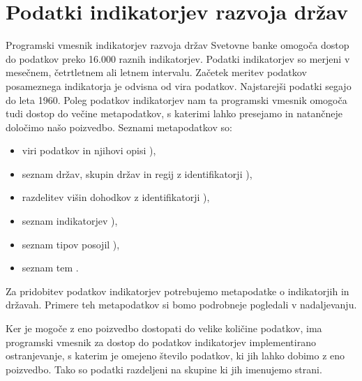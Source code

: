 \section{Podatki indikatorjev razvoja držav}
\label{sec:podatki_ind_razvoja}



Programski vmesnik indikatorjev razvoja držav Svetovne banke omogoča dostop
do podatkov preko 16.000 raznih indikatorjev. Podatki indikatorjev so merjeni v
mesečnem, četrtletnem ali letnem intervalu. Začetek meritev podatkov
posameznega indikatorja je odvisna od vira podatkov. Najstarejši podatki segajo
do leta 1960. Poleg podatkov indikatorjev nam ta programski vmesnik omogoča 
tudi dostop do večine metapodatkov, s katerimi lahko presejamo in natančneje
določimo našo poizvedbo. Seznami metapodatkov so:
\begin{itemize}
\item viri podatkov in njihovi opisi 
	),
\item seznam držav, skupin držav in regij z identifikatorji 
	),
\item razdelitev višin dohodkov z identifikatorji 
	),
\item seznam indikatorjev 
  ),
\item seznam tipov posojil 
	),
\item seznam tem .
\end{itemize}

Za pridobitev podatkov indikatorjev potrebujemo metapodatke o indikatorjih in
državah. Primere teh metapodatkov si bomo podrobneje pogledali v nadaljevanju.

Ker je mogoče z eno poizvedbo dostopati do velike količine podatkov, ima
programski vmesnik za dostop do podatkov indikatorjev implementirano
ostranjevanje, s katerim je omejeno število podatkov, ki jih lahko dobimo z eno
poizvedbo. Tako so podatki razdeljeni na skupine ki jih imenujemo strani.

